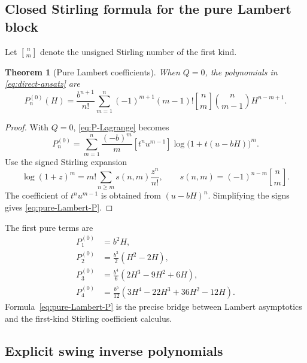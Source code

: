 \documentclass[11pt,a4paper]{article}
\numberwithin{equation}{section}
\newtheorem{theorem}{Theorem}[section]
\theoremstyle{definition}
\theoremstyle{remark}
\newcommand{\StirlingFirst}[2]{\genfrac{[}{]}{0pt}{}{#1}{#2}}
\begin{document}
\subsection{Closed Stirling formula for the pure Lambert block}

Let \(\StirlingFirst{n}{m}\) denote the unsigned Stirling number of the first
kind.

\begin{theorem}[Pure Lambert coefficients]\label{thm:pure-Lambert-Stirling}
When \(Q=0\), the polynomials in \cref{eq:direct-ansatz} are
\begin{equation}\label{eq:pure-Lambert-P}
 P_n^{(0)}(H)=
 \frac{b^{n+1}}{n!}
 \sum_{m=1}^n(-1)^{m+1}(m-1)!
 \StirlingFirst{n}{m}\binom{n}{m-1}H^{n-m+1}.
\end{equation}
\end{theorem}

\begin{proof}
With \(Q=0\), \cref{eq:P-Lagrange} becomes
\[
 P_n^{(0)}=
 \sum_{m=1}^n\frac{(-b)^m}{m}
 [t^nu^{m-1}]\log\bigl(1+t(u-bH)\bigr)^m.
\]
Use the signed Stirling expansion
\[
 \log(1+z)^m=m!\sum_{n\ge m}s(n,m)\frac{z^n}{n!},
 \qquad s(n,m)=(-1)^{n-m}\StirlingFirst{n}{m}.
\]
The coefficient of \(t^nu^{m-1}\) is obtained from
\((u-bH)^n\).  Simplifying the signs gives
\cref{eq:pure-Lambert-P}.
\end{proof}

The first pure terms are
\begin{align*}
 P_1^{(0)}&=b^2H,\\
 P_2^{(0)}&=\frac{b^3}{2}(H^2-2H),\\
 P_3^{(0)}&=\frac{b^4}{6}(2H^3-9H^2+6H),\\
 P_4^{(0)}&=\frac{b^5}{12}(3H^4-22H^3+36H^2-12H).
\end{align*}
Formula~\eqref{eq:pure-Lambert-P} is the precise bridge between Lambert
asymptotics and the first-kind Stirling coefficient calculus.

\subsection{Explicit swing inverse polynomials}
\end{document}
